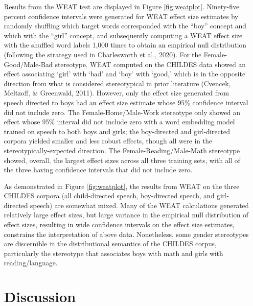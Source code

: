 \documentclass[10pt, letterpaper]{article}
\begin{document}
Results from the WEAT test are displayed in Figure \ref{fig:weatplot}.
Ninety-five percent confidence intervals were generated for WEAT effect
size estimates by randomly shuffling which target words corresponded
with the ``boy'' concept and which with the ``girl'' concept, and
subsequently computing a WEAT effect size with the shuffled word labels
1,000 times to obtain an empirical null distribution (following the
strategy used in Charlesworth et al., 2020). For the
Female-Good/Male-Bad stereotype, WEAT computed on the CHILDES data
showed an effect associating `girl' with `bad' and `boy' with `good,'
which is in the opposite direction from what is considered stereotypical
in prior literature (Cvencek, Meltzoff, \& Greenwald, 2011). However,
only the effect size generated from speech directed to boys had an
effect size estimate whose 95\% confidence interval did not include
zero. The Female-Home/Male-Work stereotype only showed an effect whose
95\% interval did not include zero with a word embedding model trained
on speech to both boys and girls; the boy-directed and girl-directed
corpora yielded smaller and less robust effects, though all were in the
stereotypically-expected direction. The Female-Reading/Male-Math
stereotype showed, overall, the largest effect sizes across all three
training sets, with all of the three having confidence intervals that
did not include zero.

As demonstrated in Figure \ref{fig:weatplot}, the results from WEAT on
the three CHILDES corpora (all child-directed speech, boy-directed
speech, and girl-directed speech) are somewhat mixed. Many of the WEAT
calculations generated relatively large effect sizes, but large variance
in the empirical null distribution of effect sizes, resulting in wide
confidence intervals on the effect size estimates, constrains the
interpretation of above data. Nonetheless, some gender stereotypes are
discernible in the distributional semantics of the CHILDES corpus,
particularly the stereotype that associates boys with math and girls
with reading/language.

\hypertarget{discussion}{%
\section{Discussion}\label{discussion}}
\end{document}
